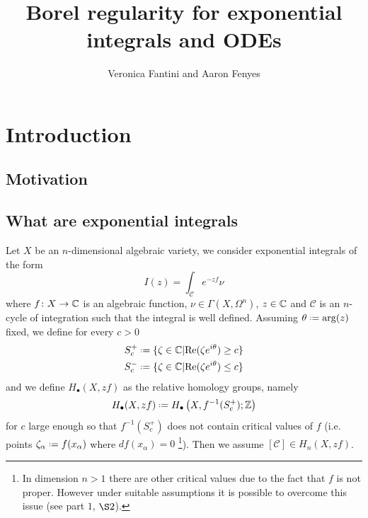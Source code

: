 \documentclass[11pt,a4paper,twoside,leqno,noamsfonts]{amsart}
\title[Borel regularity for exponential integrals and ODEs]{Borel regularity for exponential integrals and ODEs\\ [1ex]
  }
\author{
Veronica Fantini and  Aaron Fenyes 
}
\numberwithin{equation}{section}
\begin{document}
\maketitle
\tableofcontents

\section{Introduction}

\subsection{Motivation}

\subsection{What are exponential integrals}\label{what-are-exp-inte}

Let $X$ be an $n$-dimensional algebraic variety, we consider exponential integrals of the form 
\begin{equation}
\label{:exp_integral}
I(z)=\int_{\mathcal{C}}e^{-zf}\nu
\end{equation}
where $f\colon X\to \mathbb C$ is an algebraic function, $\nu\in\Gamma(X,\Omega^n)$, $z\in\mathbb C$ and $\mathcal{C}$ is an $n$-cycle of integration such that the integral is well defined. Assuming $\theta\defeq\arg(z)$ fixed, we define for every $c>0$ 
\begin{align*}
S^+_c\defeq\lbrace \zeta\in\C\vert \mathrm{Re}(\zeta e^{i\theta})\geq c\rbrace\\
S^-_c\defeq\lbrace \zeta\in\C\vert \mathrm{Re}(\zeta e^{i\theta})\leq c\rbrace
\end{align*}
and we define $H_\bullet(X,zf)$ as the relative homology groups, namely \[H_{\bullet}(X,zf)\defeq H_{\bullet}\left(X,f^{-1}(S_c^+);\Z\right)\] for $c$ large enough so that $f^{-1}(S_c^+)$ does not contain critical values of $f$ (i.e. points $\zeta_\alpha\defeq f(x_\alpha)$ where $df(x_\alpha)=0$ \footnote{In dimension $n>1$ there are other critical values due to the fact that $f$ is not proper. However under suitable assumptions it is possible to overcome this issue (see \cite{pham} part $1$, $\S 2$).}). Then we assume $[\mathcal{C}]\in H_n(X,zf)$. 
\end{document}
